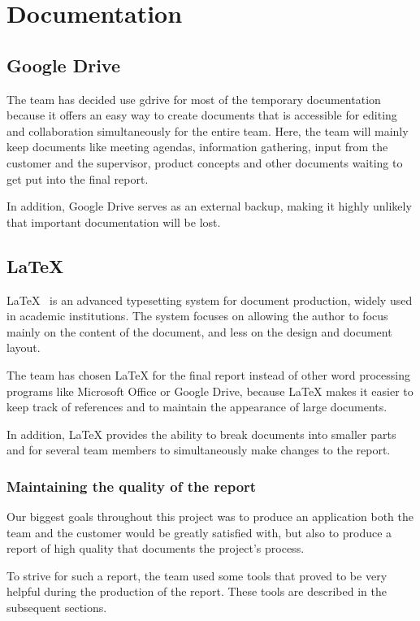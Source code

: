 \section{Documentation}

\subsection{Google Drive}
The team has decided use \gls{gdrive} for most of the temporary documentation because it offers an easy way to create documents that is accessible for editing and collaboration simultaneously for the entire team. Here, the team will mainly 
keep documents like meeting agendas, information gathering, input from the customer and the supervisor, product concepts and other documents waiting to get put into the final report. 

In addition, Google Drive serves as an external backup, making it highly unlikely that important documentation will be lost. 


\subsection{\LaTeX}
LaTeX~\cite{latex} is an advanced typesetting system for document production, widely used in
academic institutions. The system focuses on allowing the author to focus mainly on the content of the document, and less on the design and document layout.

The team has chosen LaTeX for the final report instead of other word processing programs like Microsoft Office or Google Drive, because LaTeX makes it easier to keep track of references and to maintain the appearance of large
documents. 

In addition, LaTeX provides the ability to break documents into smaller parts and for several team members to simultaneously make changes to the report.

\subsubsection{Maintaining the quality of the report}
Our biggest goals throughout this project was to produce an application both the team and the customer would be greatly satisfied with, but also to produce a report of high quality that documents the project's process. 

To strive for such a report, the team used some tools that proved to be very helpful during the production of the report. These tools are described in the subsequent sections.

